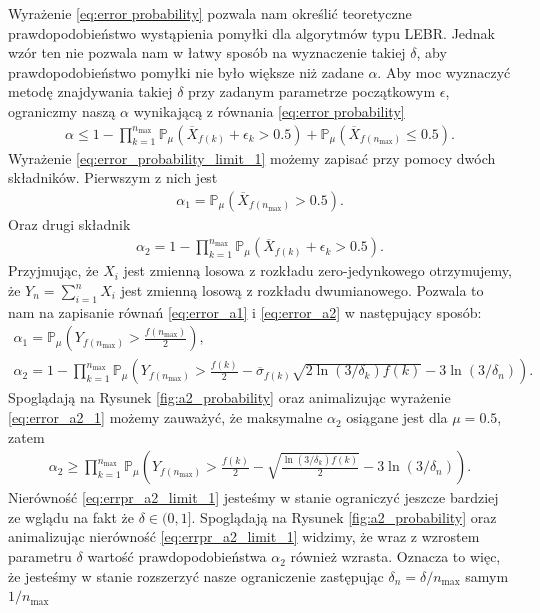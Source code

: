 \documentclass[inzynierska]{pwr_wmat_praca_dyplomowa}
\theoremstyle{plain}
\numberwithin{theorem}{chapter}
\theoremstyle{definition}
\numberwithin{theorem}{chapter}
\newcommand{\probP}{\mathbb{P}}
\newcommand{\nmax}{n_{\text{max}}}
\begin{document}
	Wyrażenie \eqref{eq:error probability} pozwala nam określić teoretyczne prawdopodobieństwo wystąpienia pomyłki dla algorytmów typu LEBR. Jednak wzór ten nie pozwala nam w łatwy sposób na wyznaczenie takiej $\delta$, aby prawdopodobieństwo pomyłki nie było większe niż zadane $\alpha$. Aby moc wyznaczyć metodę znajdywania takiej $\delta$ przy zadanym parametrze początkowym $\epsilon$, ograniczmy naszą 
	$\alpha$ wynikającą z równania \eqref{eq:error probability} 
	\begin{gather}
		\label{eq:error_probability_limit_1}
		\alpha \le
		  1-\prod^{\nmax}_{k=1} \probP_{\mu}(\overline{X}_{f(k)} +  \epsilon_{k} > 0.5) +
		 \probP_{\mu}(\overline{X}_{f(\nmax)}\le 0.5).
	\end{gather}
	Wyrażenie \eqref{eq:error_probability_limit_1} możemy zapisać przy pomocy dwóch składników. Pierwszym z nich jest 
	\begin{gather}
		\alpha_1 = \label{eq:error_a1}
		\probP_{\mu}(\overline{X}_{f(\nmax)} > 0.5).
	\end{gather}
	Oraz drugi składnik
	\begin{gather}
		\label{eq:error_a2}
		\alpha_2 = 1 - \prod^{\nmax}_{k=1} \probP_{\mu}(\overline{X}_{f(k)} +  \epsilon_{k} > 0.5).
	\end{gather}
	Przyjmując, że $X_i$ jest zmienną losowa z rozkładu zero-jedynkowego otrzymujemy, że $Y_n = \sum_{i=1}^{n}X_i$ jest zmienną losową z rozkładu dwumianowego. Pozwala to nam na zapisanie równań \eqref{eq:error_a1} i \eqref{eq:error_a2} w następujący sposób:
	\begin{gather}
		\label{eq:error_a1_1}
		\alpha_1 = \probP_{\mu}\left( Y_{f(\nmax)}>  \frac{f(\nmax)}{2} \right), \\
		\label{eq:error_a2_1}
		\alpha_2 = 1 - \prod_{k=1}^{\nmax} \probP_{\mu}\left( Y_{f(\nmax)}  > \frac{f(k)}{2} - \overline{\sigma}_{f(k)} \sqrt{2\ln(3/\delta_k)f(k)} - 3  \ln{(3 / \delta_n)} \right).
	\end{gather}
	Spoglądają na Rysunek \ref{fig:a2_probability} oraz animalizując wyrażenie \eqref{eq:error_a2_1} możemy zauważyć, że maksymalne $\alpha_2$ osiągane jest dla $\mu = 0.5$, zatem
	\begin{align}
		\label{eq:errpr_a2_limit_1}
		\alpha_2 \ge \prod_{k=1}^{\nmax} \probP_{\mu}\left( Y_{f(\nmax)}  > \frac{f(k)}{2} -  \sqrt{\frac{\ln(3/\delta_k)f(k)}{2}} - 3  \ln{(3 / \delta_n)} \right).
	\end{align}
	Nierówność \eqref{eq:errpr_a2_limit_1} jesteśmy w stanie ograniczyć jeszcze bardziej ze wglądu na fakt że $\delta\in(0, 1]$. Spoglądają na Rysunek \ref{fig:a2_probability} oraz animalizując nierówność \eqref{eq:errpr_a2_limit_1} widzimy, że wraz z wzrostem  parametru $\delta$ wartość prawdopodobieństwa $\alpha_2$ również wzrasta. Oznacza to więc, że jesteśmy w stanie rozszerzyć nasze ograniczenie zastępując $\delta_n = \delta/\nmax$ samym $1/\nmax$
\end{document}
